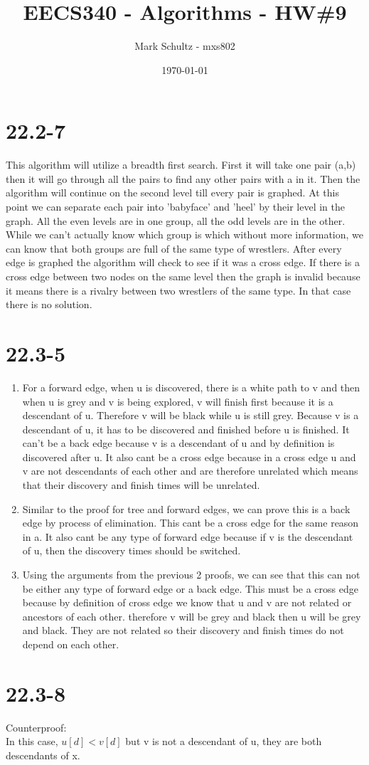 \documentclass[11pt]{article}
\begin{document}
\title{EECS340 - Algorithms - HW\#9}
\date{\today}
\author{Mark Schultz - mxs802}
\maketitle
\vspace{1.5in}
\section*{22.2-7}
This algorithm will utilize a breadth first search. First it will take one pair (a,b) then it will go through all the pairs to find any other pairs with a in it. Then the algorithm will continue on the second level till every pair is graphed. At this point we can separate each pair into 'babyface' and 'heel' by their level in the graph. All the even levels are in one group, all the odd levels are in the other. While we can't actually know which group is which without more information, we can know that both groups are full of the same type of wrestlers. After every edge is graphed the algorithm will check to see if it was a cross edge. If there is a cross edge between two nodes on the same level then the graph is invalid because it means there is a rivalry between two wrestlers of the same type. In that case there is no solution. 
\section*{22.3-5}
\begin{enumerate}
\item For a forward edge, when u is discovered, there is a white path to v and then when u is grey and v is being explored, v will finish first because it is a descendant of u. Therefore v will be black while u is still grey. Because v is a descendant of u, it has to be discovered and finished before u is finished. It can't be a back edge because v is a descendant of u and by definition is discovered after u. It also cant be a cross edge because in a cross edge u and v are not descendants of each other and are therefore unrelated which means that their discovery and finish times will be unrelated.
\item Similar to the proof for tree and forward edges, we can prove this is a back edge by process of elimination. This cant be a cross edge for the same reason in a. It also cant be any type of forward edge because if v is the descendant of u, then the discovery times should be switched. 
\item Using the arguments from the previous 2 proofs, we can see that this can not be either any type of forward edge or a back edge. This must be a cross edge because by definition of cross edge we know that u and v are not related or ancestors of each other. therefore v will be grey and black then u will be grey and black. They are not related so their discovery and finish times do not depend on each other.
\end{enumerate}
\section*{22.3-8}
Counterproof:
\vspace{1in}\\
In this case, $u[d]<v[d]$ but v is not a descendant of u, they are both descendants of x.
\end{document}
